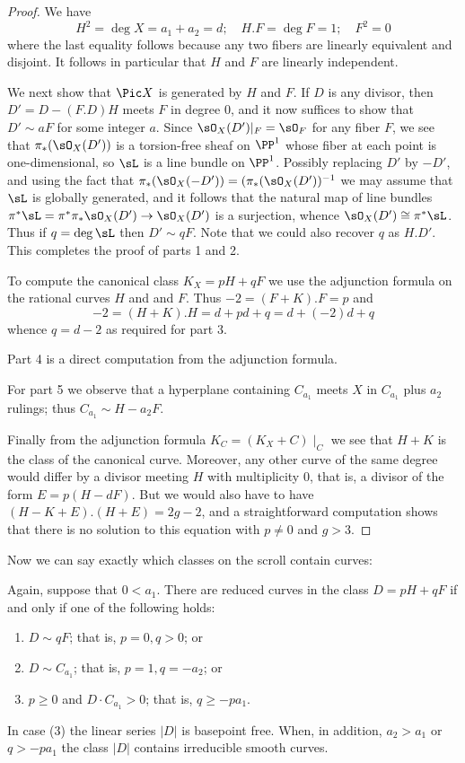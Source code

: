 \begin{proof}
We have 
$$
H^2 = \deg X = a_1+a_2 = d; \quad H.F = \deg F = 1; \quad F^2 = 0
$$
where the last equality follows because any two fibers are linearly equivalent and disjoint.
It follows in particular that $H$ and $F$ are linearly independent.

We next show that $\Pic X$ is generated by $H$ and $F$. If $D$ is any divisor,
then $D' = D - (F.D)H$ meets $F$ in degree 0, and it now suffices to show that $D'\sim aF$ for
some integer $a$.
Since $\sO_X(D')|_F = \sO_F$ for any fiber $F$, we see that
$\pi_*(\sO_X(D'))$ is a torsion-free sheaf on $\PP^1$ whose fiber at each point is one-dimensional, 
so $\sL$ is a line bundle on $\PP^1$.  Possibly replacing $D'$ by $-D'$, and using the fact that
$\pi_*(\sO_X(-D')) = (\pi_*(\sO_X(D'))^{-1}$ we may assume that $\sL$ is globally generated, and it follows that  the natural map of line bundles $\pi^*\sL = \pi^*\pi_* \sO_X(D') \to \sO_X(D') $ is a surjection, whence 
$\sO_X(D') \cong \pi^*\sL$. Thus if $q = \deg \sL$ then
$D' \sim qF$. Note that we could also recover $q$ as $H.D'$. This completes the proof of parts
1 and 2.

To compute the canonical class $K_X = pH+qF$ we use the adjunction formula on the rational curves
$H$ and and $F$. Thus $-2 = (F+K).F = p $ and 
$$
-2 = (H+K).H = d + pd+q = d + (-2)d+q
$$
whence $q = d-2$ as required for part 3.
 
 Part 4 is a direct computation from the adjunction formula.
 
For part 5 we observe that a hyperplane containing $C_{a_1}$ meets $X$ in $C_{a_1}$ plus
$a_2$ rulings; thus $C_{a_1}\sim H-a_2F$.

Finally from the adjunction formula $K_C = (K_X+C)\mid_C$ we see that $H+K$ is the class of
the canonical curve. Moreover, any other curve of the same degree would differ by
a divisor meeting $H$ with multiplicity 0, that is, a divisor of the form $E = p(H-dF)$.
But we would also have to have $(H-K+E).(H+E) = 2g-2$, and a straightforward
computation shows that there is no solution to this equation with $p\neq 0$ and $g>3$.
\end{proof}

Now we can say exactly which classes on the scroll contain curves:

\begin{theorem}\label{where are the curves?} Again, suppose that $0<a_{1}$.
There are reduced  curves in the class $D = pH+qF$ if and only if one of the following holds:

\begin{enumerate}
\item $D\sim qF$; that is, $p=0, q>0$; or
\item $D\sim C_{a_{1}}$; that is, $p=1, q=-a_{2}$; or
\item $p\geq 0$ and $D\cdot C_{a_{1}}> 0$; that is, $q \geq -pa_1.$
\end{enumerate}
In case (3) the linear series $|D|$ is basepoint free. When, in addition, $a_2>a_1$ or $q>-pa_1$ the class $|D|$ contains irreducible smooth curves.
\end{theorem}

